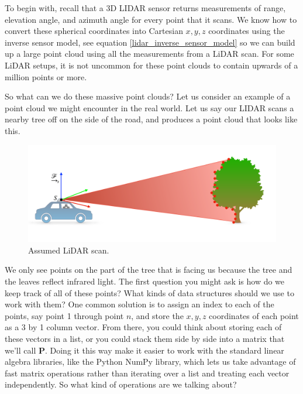 To begin with, recall that a 3D LIDAR sensor returns measurements of range, elevation angle, and azimuth angle for
every point that it scans. We know how to convert these spherical
coordinates into Cartesian $x, y, z$ coordinates using
the inverse sensor model, see equation \ref{lidar_inverse_sensor_model} so we can build up a large point cloud using
all the measurements from a LiDAR scan. For some LiDAR setups, it is not uncommon for these point clouds to contain
upwards of a million points or more. 

So what can we do these massive point clouds? Let us consider an example of a point cloud
we might encounter in the real world. Let us say our LIDAR scans a nearby
tree off on the side of the road, and produces a point cloud
that looks like this. 


\begin{figure}[!htb]
\begin{center}
\includegraphics[scale=0.280]{img/hardware/lidar_7.jpeg}
\end{center}
\caption{Assumed LiDAR scan.}
\label{lidar_7}
\end{figure}

We only see points on the part of the tree
that is facing us because the tree and the leaves reflect infrared light. The first question you might ask is how
do we keep track of all of these points? What kinds of data structures
should we use to work with them? One common solution is to assign
an index to each of the points, say point 1 through point $n$,
and store the $x, y, z$  coordinates of each point
as a 3 by 1 column vector. From there, you could think about storing
each of these vectors in a list, or you could stack them side by side
into a matrix that we'll call $\mathbf{P}$. Doing it this way make it easier to
work with the standard linear algebra libraries, like the Python NumPy library,
which lets us take advantage of fast matrix operations rather than
iterating over a list and treating each vector independently. So what kind of operations
are we talking about? 

